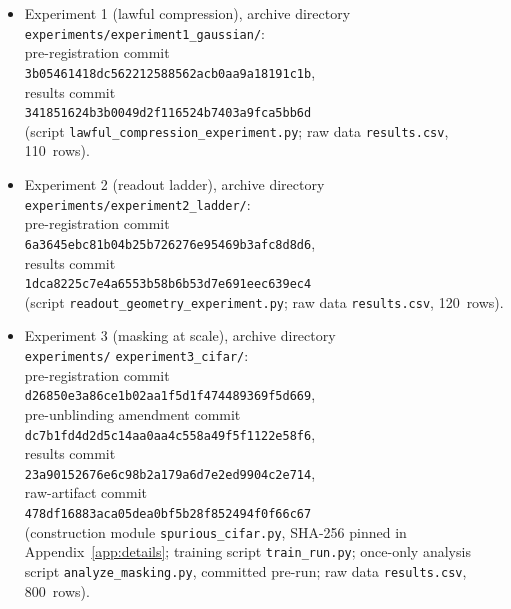 \documentclass[twocolumn,10pt]{article}
\theoremstyle{definition}
\theoremstyle{remark}
\begin{document}
\begin{itemize}
\raggedright
\item Experiment 1 (lawful compression), archive directory\\
{\small\texttt{experiments/experiment1\_gaussian/}}:\\
pre-registration commit\\
{\small\texttt{3b05461418dc562212588562acb0aa9a18191c1b}},\\
results commit\\
{\small\texttt{341851624b3b0049d2f116524b7403a9fca5bb6d}}\\
(script {\small\texttt{lawful\_compression\_experiment.py}};
raw data \texttt{results.csv}, 110~rows).
\item Experiment 2 (readout ladder), archive directory\\
{\small\texttt{experiments/experiment2\_ladder/}}:\\
pre-registration commit\\
{\small\texttt{6a3645ebc81b04b25b726276e95469b3afc8d8d6}},\\
results commit\\
{\small\texttt{1dca8225c7e4a6553b58b6b53d7e691eec639ec4}}\\
(script {\small\texttt{readout\_geometry\_experiment.py}};
raw data \texttt{results.csv}, 120~rows).
\item Experiment 3 (masking at scale), archive directory\\
{\small\texttt{experiments/}\allowbreak
\texttt{experiment3\_cifar/}}:\\
pre-registration commit\\
{\small\texttt{d26850e3a86ce1b02aa1f5d1f474489369f5d669}},\\
pre-unblinding amendment commit\\
{\small\texttt{dc7b1fd4d2d5c14aa0aa4c558a49f5f1122e58f6}},\\
results commit\\
{\small\texttt{23a90152676e6c98b2a179a6d7e2ed9904c2e714}},\\
raw-artifact commit\\
{\small\texttt{478df16883aca05dea0bf5b28f852494f0f66c67}}\\
(construction module {\small\texttt{spurious\_cifar.py}}, SHA-256
pinned in Appendix~\ref{app:details}; training script
{\small\texttt{train\_run.py}}; once-only analysis script
{\small\texttt{analyze\_masking.py}}, committed pre-run; raw data
\texttt{results.csv}, 800~rows).
\end{itemize}
\end{document}
